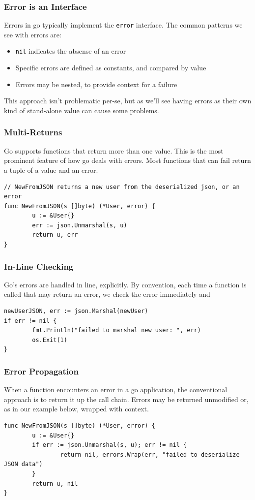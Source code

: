 \documentclass{beamer}
\begin{document}
\begin{frame}
  \frametitle{Error is an Interface}
  Errors in go typically implement the {\tt error} interface.  The
  common patterns we see with errors are:

  \begin{itemize}
  \item {\tt nil} indicates the absense of an error
  \item Specific errors are defined as constants, and compared by value
  \item Errors may be nested, to provide context for a failure
  \end{itemize}

  This approach isn't problematic per-se, but as we'll see having
  errors as their own kind of stand-alone value can cause some
  problems.
\end{frame}

\begin{frame}[fragile]
  \frametitle{Multi-Returns}
  Go supports functions that return more than one value.  This is the
  most prominent feature of how go deals with errors. Most functions
  that can fail return a tuple of a value and an error.
  \par\pause
\begin{lstlisting}[language=Golang]
// NewFromJSON returns a new user from the deserialized json, or an error
func NewFromJSON(s []byte) (*User, error) {
        u := &User{}
        err := json.Unmarshal(s, u)
        return u, err
}
\end{lstlisting}
\end{frame}

\begin{frame}[fragile]
  \frametitle{In-Line Checking}
  Go's errors are handled in line, explicitly.  By convention, each
  time a function is called that may return an error, we check the
  error immediately and
  \par\pause
\begin{lstlisting}[language=Golang]
newUserJSON, err := json.Marshal(newUser)
if err != nil {
        fmt.Println("failed to marshal new user: ", err)
        os.Exit(1)
}
\end{lstlisting}
\end{frame}

\begin{frame}[fragile]
  \frametitle{Error Propagation}
  When a function encounters an error in a go application, the
  conventional approach is to return it up the call chain.  Errors may
  be returned unmodified or, as in our example below, wrapped with
  context.
  \par\pause
\begin{lstlisting}[language=Golang]
func NewFromJSON(s []byte) (*User, error) {
        u := &User{}
        if err := json.Unmarshal(s, u); err != nil {
                return nil, errors.Wrap(err, "failed to deserialize JSON data")
        }
        return u, nil
}
\end{lstlisting}
\end{frame}
\end{document}
